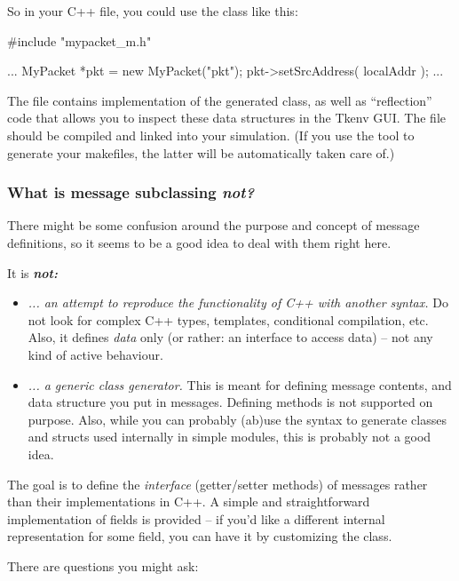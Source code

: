So in your C++ file, you could use the  class like this:

\begin{cpp}
#include "mypacket_m.h"

...
MyPacket *pkt = new MyPacket("pkt");
pkt->setSrcAddress( localAddr );
...
\end{cpp}

The  file contains implementation of the generated 
class, as well as ``reflection'' code that allows you to inspect these data
structures in the Tkenv GUI. The  file should be compiled and
linked into your simulation. (If you use the  tool
to generate your makefiles, the latter will be automatically taken care of.)


\subsubsection{What is message subclassing \textit{not?}}

There might be some confusion around the purpose and
concept of message definitions, so it seems to be a good idea
to deal with them right here.

It is \textit{\textbf{not:}}

\begin{itemize}
  \item{\textit{... an attempt to reproduce the functionality of C++ with another
     syntax.} Do not look for complex C++ types, templates, conditional compilation, etc.
     Also, it defines \textit{data} only (or rather: an interface to access
     data) -- not any kind of active behaviour.}
  \item{\textit{... a generic class generator.} This is meant for defining message
     contents, and data structure you put in messages.
     Defining methods is not supported on purpose.
     Also, while you can probably (ab)use the syntax to
     generate classes and structs used internally in simple modules,
     this is probably not a good idea.}
\end{itemize}

The goal is to define the \textit{interface} (getter/setter methods) of messages
rather than their implementations in C++. A simple and straightforward
implementation of fields is provided -- if you'd like a different internal
representation for some field, you can have it by customizing the class.

There are questions you might ask:

